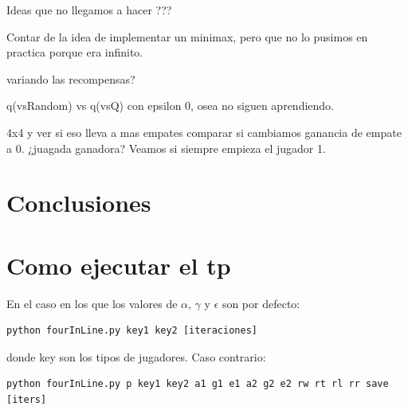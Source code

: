 \documentclass[10pt, a4paper]{article}
\begin{document}
Ideas que no llegamos a hacer ???

Contar de la idea de implementar un minimax, pero que no lo pusimos en practica porque era infinito.

variando las recompensas?

q(vsRandom) vs q(vsQ) con epsilon 0, osea no siguen aprendiendo.


4x4 y ver si eso lleva a  mas empates
comparar si cambiamos ganancia de empate a 0.
¿juagada ganadora? Veamos si siempre empieza el jugador 1.






\section{Conclusiones}

\section{Como ejecutar el tp}



En el caso en los que los valores de $\alpha$, $\gamma$ y $\epsilon$ son por defecto:
\begin{lstlisting}
python fourInLine.py key1 key2 [iteraciones]  
\end{lstlisting}
donde key son los tipos de jugadores. Caso contrario: \\
\begin{lstlisting}
python fourInLine.py p key1 key2 a1 g1 e1 a2 g2 e2 rw rt rl rr save [iters]
\end{lstlisting}
\end{document}
